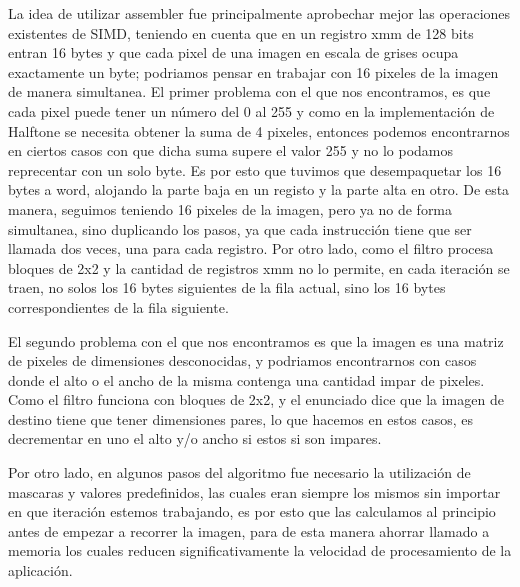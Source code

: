 La idea de utilizar assembler fue principalmente aprobechar mejor las operaciones existentes de SIMD, teniendo en cuenta que en un registro xmm de 128 bits entran 16 bytes y que cada pixel de una imagen en escala de grises ocupa exactamente un byte; podriamos pensar en trabajar con 16 pixeles de la imagen de manera simultanea. El primer problema con el que nos encontramos, es que cada pixel puede tener un número del 0 al 255 y como en la implementación de Halftone se necesita obtener la suma de 4 pixeles, entonces podemos encontrarnos en ciertos casos con que dicha suma supere el valor 255 y no lo podamos reprecentar con un solo byte. Es por esto que tuvimos que desempaquetar los 16 bytes a word, alojando la parte baja en un registo y la parte alta en otro. De esta manera, seguimos teniendo 16 pixeles de la imagen, pero ya no de forma simultanea, sino duplicando los pasos, ya que cada instrucción tiene que ser llamada dos veces, una para cada registro.
Por otro lado, como el filtro procesa bloques de 2x2 y la cantidad de registros xmm no lo permite, en cada iteración se traen, no solos los 16 bytes siguientes de la fila actual, sino los 16 bytes correspondientes de la fila siguiente.

El segundo problema con el que nos encontramos es que la imagen es una matriz de pixeles de dimensiones desconocidas, y podriamos encontrarnos con casos donde el alto o el ancho de la misma contenga una cantidad impar de pixeles. Como el filtro funciona con bloques de 2x2, y el enunciado dice que la imagen de destino tiene que tener dimensiones pares, lo que hacemos en estos casos, es decrementar en uno el alto y/o ancho si estos si son impares.

Por otro lado, en algunos pasos del algoritmo fue necesario la utilización de mascaras y valores predefinidos, las cuales eran siempre los mismos sin importar en que iteración estemos trabajando, es por esto que las calculamos al principio antes de empezar a recorrer la imagen, para de esta manera ahorrar llamado a memoria los cuales reducen significativamente la velocidad de procesamiento de la aplicación.

